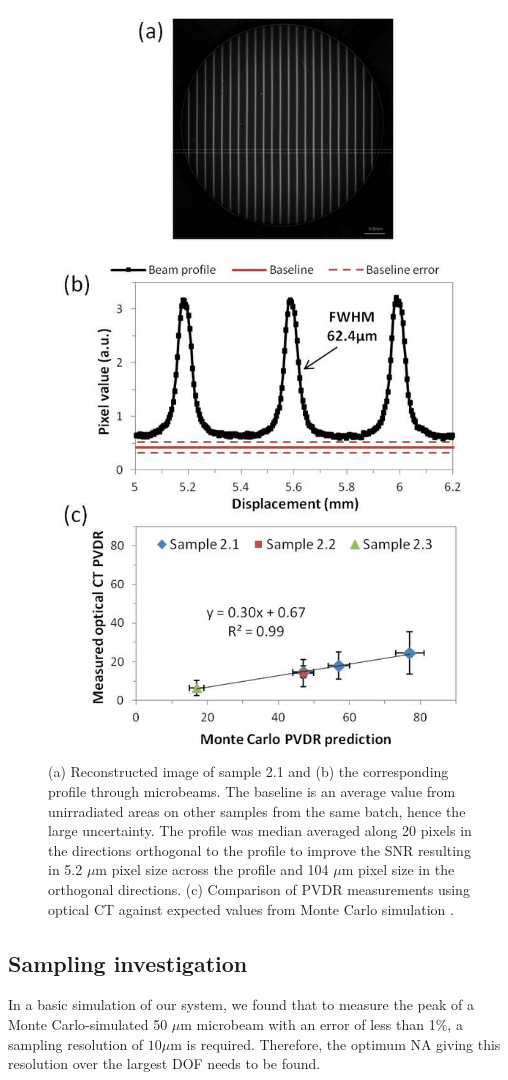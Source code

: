 	\begin{figure}
		\centering
		\includegraphics[width=0.6\linewidth]{mrt_img/mrt_Fig7}
		\caption{(a) Reconstructed image of sample 2.1 and (b) the corresponding profile through microbeams. The baseline is an average value from unirradiated areas on other samples from the same batch, hence the large uncertainty. The profile was median averaged along 20 pixels in the directions orthogonal to the profile to improve the SNR resulting in 5.2 $\mu$m pixel size across the profile and 104 $\mu$m pixel size in the orthogonal directions. (c) Comparison of PVDR measurements using optical CT against expected values from Monte Carlo simulation \cite{martinez-roviradevelopment2012}.}
		\label{fig:Fig7}
	\end{figure}
	
	\subsection{Sampling investigation}
	In a basic simulation of our system, we found that to measure the peak of a Monte Carlo-simulated 50 $\mu$m microbeam with an error of less than 1\%, a sampling resolution of $10 \mu$m is required. Therefore, the optimum NA giving this resolution over the largest DOF needs to be found.  
		

